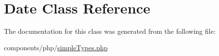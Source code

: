 \hypertarget{class_date}{
\section{Date Class Reference}
\label{class_date}
}


The documentation for this class was generated from the following file:\begin{CompactItemize}
\item 
components/php/\hyperlink{simple_types_8php}{simpleTypes.php}\end{CompactItemize}
